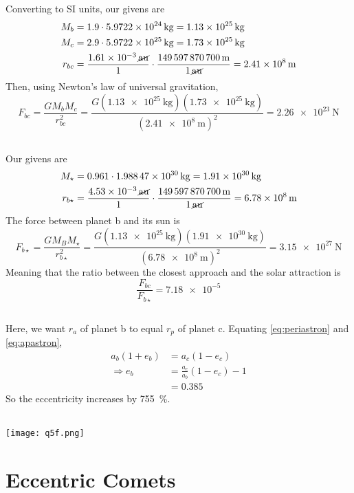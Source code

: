 \documentclass{article}
\begin{document}
Converting to SI units, our givens are
\begin{align}
    M_b &= 1.9 \cdot \SI{5.9722e+24}{\kilogram} = \SI{1.13e+25}{\kilogram} \\
    M_c &= 2.9 \cdot \SI{5.9722e+25}{\kilogram} = \SI{1.73e+25}{\kilogram} \\
    r_{bc} &= \frac{\SI{1.61e-3}{\cancel\astronomicalunit}}{1} \cdot \frac{\SI{149597870700}{\meter}}{\SI{1}{\cancel\astronomicalunit}} = \SI{2.41e+8}{\meter}
\end{align}
Then, using Newton's law of universal gravitation,
\begin{equation}
    F_{bc} = \frac{G M_b M_c}{r_{bc}^2} = \frac{G (\SI{1.13e+25}{\kilogram}) (\SI{1.73e+25}{\kilogram})}{(\SI{2.41e+8}{\meter})^2} = \SI{2.26e+23}{\newton}
\end{equation}

\subsection{}

Our givens are
\begin{align}
    M_\star &= 0.961 \cdot \SI{1.98847e+30}{\kilogram} = \SI{1.91e+30}{\kilogram}\\
    r_{b\star} &= \frac{\SI{4.53e-3}{\cancel\astronomicalunit}}{1} \cdot \frac{\SI{149597870700}{\meter}}{\SI{1}{\cancel\astronomicalunit}} = \SI{6.78e+8}{\meter}
\end{align}
The force between planet b and its sun is
\begin{equation}
    F_{b\star} = \frac{G M_B M_\star}{r_{b\star}^2} = \frac{G (\SI{1.13e+25}{\kilogram}) (\SI{1.91e+30}{\kilogram})}{(\SI{6.78e+8}{\meter})^2} = \SI{3.15e+27}{\newton}
\end{equation}
Meaning that the ratio between the closest approach and the solar attraction is
\begin{equation}
    \frac{F_{bc}}{F_{b\star}} = \num{7.18e-5}
\end{equation}

\subsection{}

Here, we want \(r_a\) of planet b to equal \(r_p\) of planet c.
Equating \autoref{eq:periastron} and \autoref{eq:apastron},
\begin{align}
    a_b (1 + e_b) &= a_c (1 - e_c) \\
    \Rightarrow e_b &= \frac{a_c}{a_b} (1 - e_c) - 1 \\
    &= 0.385
\end{align}
So the eccentricity increases by \SI{755}{\percent}.

\subsection{}

\begin{center}
    \texttt{[image: q5f.png]}
\end{center}

\section{Eccentric Comets}
\end{document}
